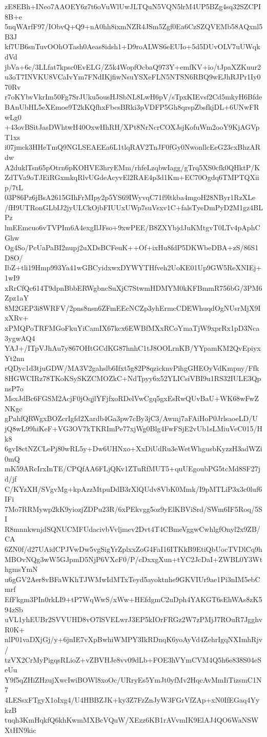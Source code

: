 zE8EBh+INeo7AAOEY6z7t6oVuWlUwJLTQuN5VQN5lrM4UP5BZg4sq32SZCPI8B+e
5nqWArfF97/IObvQ+Q9+nA0hh8ixmNZR4JSm5Zgf0Ea6CzSZQVEMb58AQxnl5B3J
kf7UB6snTuvOOhOTash0Aeas8idsh1+D9roALWS6eEUIo+5d5DUvOLV7uUWqkdVd
jbVa+6c/3LLfat7kpsc0EvELG/Z5k4WopfOcbaQ973Y+emfKV+io/tJpaXZKuur2
u3oT7INVKU8VCaIvYm7FNdIKjfiwNsuYSXeFLN5NTSN6RBQ9wEJhRJPr1Iy070Rv
r7oKYbvVkrIm50Fg7SrJUku5ousHJSbNL8LwH6pV/sTpxKIEvsf2Cd5mkyH6Bfde
BAnUbHL5eXEmoe9T2kKQfhxFbcsBRki3pVDFP5Gh8qrspZbsfkjDL+6UNwFRwLg0
+43ovBSitJasDWhtwH40OxwHhRH/XPt8NrNcrCOXJsjKofuWm2ooY9KjAGVpT1xs
i07jmck3HHeTmQ9NGLSEAEEa6L1tlqRAV2TnJF0fGy0NwonllcEeG23cxBhzARdw
A2duklTsn65pOtrn6pKOHVE3hryEMm/rhfeLzqbwIagg/gTrq5XS0cfk0QHktP/K
ZdTVa9oTJEiRGxmkqRlvUGdeAcyvEl2RAE4p3d1Km+EC70Ogdq6TMPTQXiip/7tL
03P86Pz6jBsA2615GIhFrMIpy2p5YS69IWyvqC71f9ltkba4mgoH28NByr1RzXLe
/fH9UTRonGLbIJ2jyULCkOjbFIUUxUWp7suVsxv1C+falsTyeDmPyD2M1gz4BLPz
lmEEmcuo6vTVPIm6A4exgIlJFso+9xwPEE/B8ZXYbjdJuKMtgvT0LTv4pAphCGhw
Og4So/PcUaPaBI2nupj2uXDsBCFeuK++Of+ixHu8fdP5DKWbeDBA+zS/86S1D8O/
IbZ+tli19Hmp993Ya41wGBCyidxwxDYWYTHfveh2UoKE01Up9GW5ReXNIEj+1wI9
xRrCfQc614T9dpnBbbERWgbncSuXjC7StwmHDMYM0kKFBmmR756bG/3PM6Zpz1aY
8M2GEP3i8WRFV/2pns8nsn6ZFmEEcNCZp3yhErmcCDEWhuqdOgNUsrMjX9IxXRv+
xPMQPoTRFMGoFkuYiCamIX67kcx6EWBfMXxRCoYmaTjW9xprRx1pD3Nca3ygwAQ4
YAJ+/ITpVJhAu7y867OHtGCdKG87hnhC1tJ8OOLrnKB/YYpamKM2QvEpiyxYt2nn
rQDyc1d3tjuGDW/MA3V2gahslb6Ifxt5g82P8qzicknvPihgGHEOyVdKmpny/Ffk
8HGWCIRz78TKoKSySKZCMOZkC+NdTpyy6x52YLICsiVBI9u1RS32IULE3QpnsP7o
MsxJdBc6FGSM2AcjF0jOqjlYFjfxoRDelVwCgq5gxEsRwQUvBaU+WK68wFwZNKgc
gPahfQRWgxBOZcrIgfd2Xardb4Ga3pw7cBy3jC3/Awmj7aFAiHoP0JrlsaoeLD/U
jQ8wL99hiKeF+VG3OV7kTKRImPe77xjWg0Blg4FwFSjE2vUb1sLMiuVeC015/Hk8
6gvI8ctNZCLePj80wRL5y+Dw6UHNxo+XxDiUdRu3eWetWhgusbKyzzH3adWZi0mQ
mK59ARcIrxInTE/CPQfAA6FLjQKv1ZTuRfMUT5+quUEgoubPG5tcMd8SF27jd/jf
C/KYzXH/SVgvMg+kpAzzMtpuDdB3rXlQUdv8VbK0Mmk/I9pMTLiP3x3c0luf6IFi
7Mo7RRMywp2kK9yiozjZDPu23R/6xPEkvgg5oz9yElKBViSrd/SWm6IF5Roq/5SI
R8mnnkwnjdSQNUCMFUdacivbVvljmev2Dvt4T4CBmeVggwCwhlgfOnyl2x9ZB/CA
6ZN0f/d27UAidCPJVwDw5vgSigYrZplxxZoG4FaI16ITKkB9EtiQbUocTVDlCq9h
MBOvNQg3wW5GJpmD5NjP6VXcF0/P/cDxxgXun+tYC2JcDaI+ZWBL0Y3WthgmsYmN
u6gGV2Aer8vBFaWKhTJWMwIdMTxTeyd5ayoktnhe9GKVIUr9ae1Pi3nIM5ebCmrf
EfFkgm3PIn0rkLI9+tP7WqWwS/xWw+HEfdgmC2uDph4YAKGT6sEhWAs8zK594zSb
uVL1yhEUBr2SVVUHD8vO7lSVELwrJ3EP5kIOrFRGz2W7zPMjJ7ROuR7JgghvR0K+
nlP01vaDXjGj/y+6jnIE7vXpBwhiWMPY3IkRDnqK6yoAyVd4ZehrIgqNXImhRjv/
tzVX2CrMyPigqsRLioZ+vZBVHJe8vv09dLb+FOE3hVYmCVM4Q5h6e838S04eSeUu
Y9f5qZHiZHzujXwcIwiBOWl8xoOc/URryEs5YmJt0yfMv2HqcAvMmIiTizsmC1N7
4LESsxFTgyX1oIxg4/U4HBBZJK+ky3Z7FzZnJyW3FGrVfZAp+xN0IfEGaq4YykzB
tuqh3KmHqkfQ6khKwmMXBcVQuW/XEzz6KB1rAVvmIK9ElAJ4QO6WaNSWXtHN9kic

